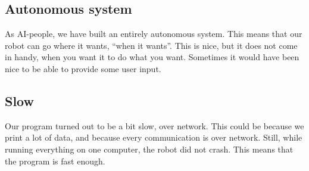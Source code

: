 \subsection{Autonomous system}
As AI-people, we have built an entirely autonomous system. This means that our
robot can go where it wants, ``when it wants''. This is nice, but it does not
come in handy, when you want it to do what you want. Sometimes it would have
been nice to be able to provide some user input. 

\subsection{Slow}
Our program turned out to be a bit slow, over network. This could be because we
print a lot of data, and because every communication is over network. Still,
while running everything on one computer, the robot did not crash. This means
that the program is fast enough.

